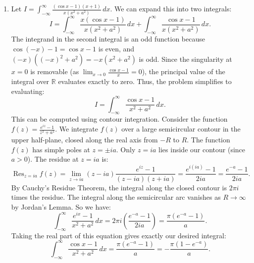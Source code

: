 \documentclass{article}
\begin{document}
\begin{enumerate}[label=\fbox{\arabic*}]
  \item %
        Let $I = \int_{-\infty}^\infty \frac{(\cos x - 1)(x + 1)}{x(x^2 + a^2)} \, dx$. We can expand this into two integrals:
        \[
          I = \int_{-\infty}^\infty \frac{x(\cos x - 1)}{x(x^2 + a^2)} \, dx + \int_{-\infty}^\infty \frac{\cos x - 1}{x(x^2 + a^2)} \, dx.
        \]
        The integrand in the second integral is an odd function because $\cos(-x) - 1 = \cos x - 1$ is even, and $(-x)((-x)^2 + a^2) = -x(x^2 + a^2)$ is odd. Since the singularity at $x=0$ is removable (as $\lim_{x \to 0} \frac{\cos x - 1}{x} = 0$), the principal value of the integral over $\mathbb{R}$ evaluates exactly to zero.
        Thus, the problem simplifies to evaluating:
        \[
          I = \int_{-\infty}^\infty \frac{\cos x - 1}{x^2 + a^2} \, dx.
        \]
        This can be computed using contour integration. Consider the function $f(z) = \frac{e^{iz} - 1}{z^2 + a^2}$. 
        We integrate $f(z)$ over a large semicircular contour in the upper half-plane, closed along the real axis from $-R$ to $R$.
        The function $f(z)$ has simple poles at $z = \pm ia$. Only $z = ia$ lies inside our contour (since $a > 0$).
        The residue at $z = ia$ is:
        \[
          \operatorname{Res}_{z=ia} f(z) = \lim_{z \to ia} (z - ia) \frac{e^{iz} - 1}{(z - ia)(z + ia)} = \frac{e^{i(ia)} - 1}{2ia} = \frac{e^{-a} - 1}{2ia}.
        \]
        By Cauchy's Residue Theorem, the integral along the closed contour is $2\pi i$ times the residue. The integral along the semicircular arc vanishes as $R \to \infty$ by Jordan's Lemma.
        So we have:
        \[
          \int_{-\infty}^\infty \frac{e^{ix} - 1}{x^2 + a^2} \, dx = 2\pi i \left( \frac{e^{-a} - 1}{2ia} \right) = \frac{\pi (e^{-a} - 1)}{a}.
        \]
        Taking the real part of this equation gives exactly our desired integral:
        \[
          \int_{-\infty}^\infty \frac{\cos x - 1}{x^2 + a^2} \, dx = \frac{\pi (e^{-a} - 1)}{a} = -\frac{\pi (1 - e^{-a})}{a}.
        \]


\end{enumerate}
\end{document}
